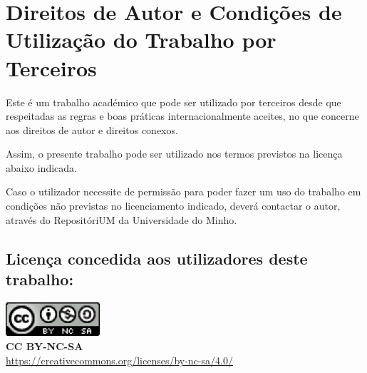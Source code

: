 \chapter*{Direitos de Autor e Condições de Utilização do Trabalho por Terceiros}
\setlength{\parskip}{1em}
\noindent
Este é um trabalho académico que pode ser utilizado por terceiros desde que respeitadas as regras e boas práticas internacionalmente aceites, no que concerne aos direitos de autor e direitos conexos.

\noindent
Assim, o presente trabalho pode ser utilizado nos termos previstos na licença abaixo indicada.

\noindent
Caso o utilizador necessite de permissão para poder fazer um uso do trabalho em condições não previstas no licenciamento indicado, deverá contactar o autor, através do RepositóriUM da Universidade do Minho.

\section*{Licença concedida aos utilizadores deste trabalho:}




\noindent
\includegraphics[]{images/CCBYNCSA.png}
\\
\textbf{CC BY-NC-SA}
\\
\url{https://creativecommons.org/licenses/by-nc-sa/4.0/}


\noindent

\setlength{\parskip}{0em}